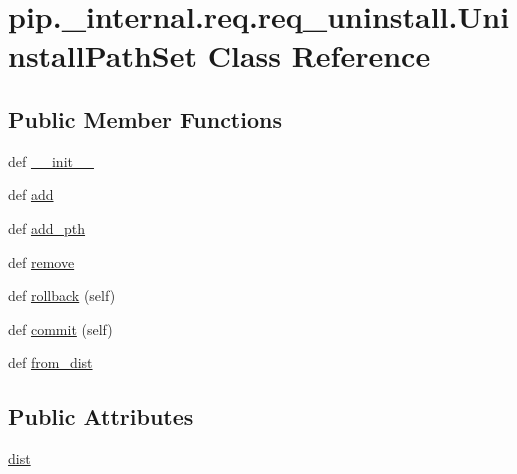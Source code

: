 \hypertarget{classpip_1_1__internal_1_1req_1_1req__uninstall_1_1UninstallPathSet}{}\section{pip.\+\_\+internal.\+req.\+req\+\_\+uninstall.\+Uninstall\+Path\+Set Class Reference}
\label{classpip_1_1__internal_1_1req_1_1req__uninstall_1_1UninstallPathSet}
\subsection*{Public Member Functions}
\begin{DoxyCompactItemize}
\item 
def \hyperlink{classpip_1_1__internal_1_1req_1_1req__uninstall_1_1UninstallPathSet_a1b9bbeac06286e3de82cb7ccf4b4abc7}{\+\_\+\+\_\+init\+\_\+\+\_\+}
\item 
def \hyperlink{classpip_1_1__internal_1_1req_1_1req__uninstall_1_1UninstallPathSet_a5670c55803e95dbcd1e72813753f7141}{add}
\item 
def \hyperlink{classpip_1_1__internal_1_1req_1_1req__uninstall_1_1UninstallPathSet_aa40d76799e4d8b177faa5f1dc1844313}{add\+\_\+pth}
\item 
def \hyperlink{classpip_1_1__internal_1_1req_1_1req__uninstall_1_1UninstallPathSet_a82b9edf1e70583570d577420bf2830ec}{remove}
\item 
def \hyperlink{classpip_1_1__internal_1_1req_1_1req__uninstall_1_1UninstallPathSet_a3cb862c5b92e27096041de6ce997b217}{rollback} (self)
\item 
def \hyperlink{classpip_1_1__internal_1_1req_1_1req__uninstall_1_1UninstallPathSet_a46a1e89cd11e8adc8781a9a592d88c9c}{commit} (self)
\item 
def \hyperlink{classpip_1_1__internal_1_1req_1_1req__uninstall_1_1UninstallPathSet_ab3d5baa533968bd57ada3f88fab312d7}{from\+\_\+dist}
\end{DoxyCompactItemize}
\subsection*{Public Attributes}
\begin{DoxyCompactItemize}
\item 
\hyperlink{classpip_1_1__internal_1_1req_1_1req__uninstall_1_1UninstallPathSet_a043ffbf49882f8c71274584224120da9}{dist}
\end{DoxyCompactItemize}


